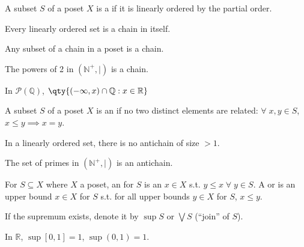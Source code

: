 \begin{definition}[Chain]
    A subset $S$ of a poset $X$ is a  if it is linearly ordered by the partial order.
\end{definition}

\begin{example}
    Every linearly ordered set is a chain in itself.
\end{example}

\begin{example}
    Any subset of a chain in a poset is a chain.
\end{example}

\begin{example}
    The powers of 2 in $(\mathbb N^+, \mid)$ is a chain.
\end{example}

\begin{example}
    In $\mathcal{P}(\mathbb{Q})$, $\qty{(-\infty, x) \cap \mathbb{Q} : x \in \mathbb{R}}$
\end{example}

\begin{definition}[Antichain]
    A subset $S$ of a poset $X$ is an  if no two distinct elements are related: $\forall \; x, y \in S$, $x \leq y \implies x = y$.
\end{definition}

\begin{example}
    In a linearly ordered set, there is no antichain of size $> 1$.
\end{example}

\begin{example}
    The set of primes in $(\mathbb N^+, \mid)$ is an antichain.
\end{example}

\begin{definition}[Supremum]
    For $S \subseteq X$ where $X$ a poset, an  for $S$ is an $x \in X$ s.t. $y \leq x \; \forall \; y \in S$.
    A  or  is an upper bound $x \in X$ for $S$ s.t. for all upper bounds $y \in X$ for $S$, $x \leq y$.
\end{definition}

\begin{notation}
    If the supremum exists, denote it by $\sup S$ or $\bigvee S$ (``join'' of $S$).
\end{notation}

\begin{example}
    In $\mathbb{R}$, $\sup [0, 1] = 1$, $\sup (0, 1) = 1$.
\end{example}

